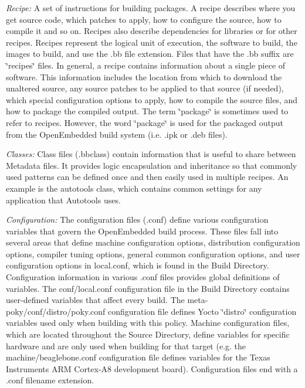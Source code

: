 \begin{DoxyItemize}
\begin{DoxyItemize}
\item {\itshape Recipe\+:} A set of instructions for building packages. A recipe describes where you get source code, which patches to apply, how to configure the source, how to compile it and so on. Recipes also describe dependencies for libraries or for other recipes. Recipes represent the logical unit of execution, the software to build, the images to build, and use the .bb file extension. Files that have the .bb suffix are \char`\"{}recipes\char`\"{} files. In general, a recipe contains information about a single piece of software. This information includes the location from which to download the unaltered source, any source patches to be applied to that source (if needed), which special configuration options to apply, how to compile the source files, and how to package the compiled output. The term \char`\"{}package\char`\"{} is sometimes used to refer to recipes. However, the word \char`\"{}package\char`\"{} is used for the packaged output from the Open\+Embedded build system (i.\+e. .ipk or .deb files).
\item {\itshape Classes\+:} Class files (.bbclass) contain information that is useful to share between Metadata files. It provides logic encapsulation and inheritance so that commonly used patterns can be defined once and then easily used in multiple recipes. An example is the autotools class, which contains common settings for any application that Autotools uses.
\item {\itshape Configuration\+:} The configuration files (.conf) define various configuration variables that govern the Open\+Embedded build process. These files fall into several areas that define machine configuration options, distribution configuration options, compiler tuning options, general common configuration options, and user configuration options in local.\+conf, which is found in the Build Directory. Configuration information in various .conf files provides global definitions of variables. The conf/local.\+conf configuration file in the Build Directory contains user-\/defined variables that affect every build. The meta-\/poky/conf/distro/poky.\+conf configuration file defines Yocto \char`\"{}distro\char`\"{} configuration variables used only when building with this policy. Machine configuration files, which are located throughout the Source Directory, define variables for specific hardware and are only used when building for that target (e.\+g. the machine/beaglebone.\+conf configuration file defines variables for the Texas Instruments A\+RM Cortex-\/\+A8 development board). Configuration files end with a .conf filename extension.

\end{DoxyItemize}
\end{DoxyItemize}
